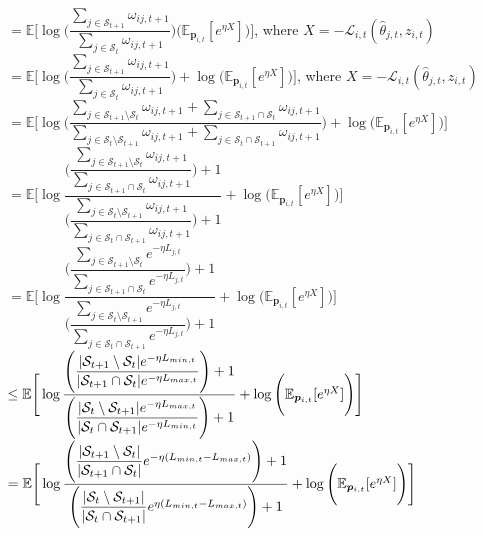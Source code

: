 \documentclass{article}
\theoremstyle{definition}
\begin{document}
    $=\mathbb{E}\Bigg[\log{\Bigg({\dfrac{\sum_{j\in\mathcal{S}_{t+1}}\omega_{ij,t+1}}{\sum_{j\in\mathcal{S}_{t}}\omega_{ij,t+1}}}\Bigg)\Bigg(\mathbb{E}_{\bm{p}_{i,t}}[e^{\eta X}]}\Bigg)\Bigg]$, where $X=-\mathcal{L}_{i,t}(\hat{\theta}_{j,t},z_{i,t})$\\
    $=\mathbb{E}\Bigg[\log{\Bigg({\dfrac{\sum_{j\in\mathcal{S}_{t+1}}\omega_{ij,t+1}}{\sum_{j\in\mathcal{S}_{t}}\omega_{ij,t+1}}}\Bigg)}+\log{\Bigg(\mathbb{E}_{\bm{p}_{i,t}}[e^{\eta X}]}\Bigg)\Bigg]$, where $X=-\mathcal{L}_{i,t}(\hat{\theta}_{j,t},z_{i,t})$\\
    $=\mathbb{E}\Bigg[\log{\Bigg({\dfrac{\sum_{j\in\mathcal{S}_{t+1}\setminus\mathcal{S}_{t}}\omega_{ij,t+1}+\sum_{j\in\mathcal{S}_{t+1}\cap\mathcal{S}_{t}}\omega_{ij,t+1}}{\sum_{j\in\mathcal{S}_{t}\setminus\mathcal{S}_{t+1}}\omega_{ij,t+1}+\sum_{j\in\mathcal{S}_{t}\cap\mathcal{S}_{t+1}}\omega_{ij,t+1}}}\Bigg)}+\log{\Bigg(\mathbb{E}_{\bm{p}_{i,t}}[e^{\eta X}]}\Bigg)\Bigg]$\\
    $=\mathbb{E}\Bigg[\log{{\dfrac{\Bigg(\dfrac{\sum_{j\in\mathcal{S}_{t+1}\setminus\mathcal{S}_{t}}\omega_{ij,t+1}}{\sum_{j\in\mathcal{S}_{t+1}\cap\mathcal{S}_{t}}\omega_{ij,t+1}}\Bigg)+1}{\Bigg(\dfrac{\sum_{j\in\mathcal{S}_{t}\setminus\mathcal{S}_{t+1}}\omega_{ij,t+1}}{\sum_{j\in\mathcal{S}_{t}\cap\mathcal{S}_{t+1}}\omega_{ij,t+1}}\Bigg)+1}}}+\log{\Bigg(\mathbb{E}_{\bm{p}_{i,t}}[e^{\eta X}]}\Bigg)\Bigg]$\\
    $=\mathbb{E}\Bigg[\log{{\dfrac{\Bigg(\dfrac{\sum_{j\in\mathcal{S}_{t+1}\setminus\mathcal{S}_{t}}e^{-\eta L_{j,t}}}{\sum_{j\in\mathcal{S}_{t+1}\cap\mathcal{S}_{t}}e^{-\eta L_{j,t}}}\Bigg)+1}{\Bigg(\dfrac{\sum_{j\in\mathcal{S}_{t}\setminus\mathcal{S}_{t+1}}e^{-\eta L_{j,t}}}{\sum_{j\in\mathcal{S}_{t}\cap\mathcal{S}_{t+1}}e^{-\eta L_{j,t}}}\Bigg)+1}}}+\log{\Bigg(\mathbb{E}_{\bm{p}_{i,t}}[e^{\eta X}]}\Bigg)\Bigg]$\\
    $\leq\mathbb{E}\Bigg[\log{{\dfrac{\Bigg(\dfrac{\abs{\mathcal{S}_{t+1}\setminus\mathcal{S}_{t}}e^{-\eta L_{min,t}}}{\abs{\mathcal{S}_{t+1}\cap\mathcal{S}_{t}}e^{-\eta L_{max,t}}}\Bigg)+1}{\Bigg(\dfrac{\abs{\mathcal{S}_{t}\setminus\mathcal{S}_{t+1}}e^{-\eta L_{max,t}}}{\abs{\mathcal{S}_{t}\cap\mathcal{S}_{t+1}}e^{-\eta L_{min,t}}}\Bigg)+1}}}+\log{\Bigg(\mathbb{E}_{\bm{p}_{i,t}}[e^{\eta X}]}\Bigg)\Bigg]$\\
    $=\mathbb{E}\Bigg[\log{{\dfrac{\Bigg(\dfrac{\abs{\mathcal{S}_{t+1}\setminus\mathcal{S}_{t}}}{\abs{\mathcal{S}_{t+1}\cap\mathcal{S}_{t}}}e^{-\eta(L_{min,t}-L_{max,t})}\Bigg)+1}{\Bigg(\dfrac{\abs{\mathcal{S}_{t}\setminus\mathcal{S}_{t+1}}}{\abs{\mathcal{S}_{t}\cap\mathcal{S}_{t+1}}}e^{\eta(L_{min,t}-L_{max,t})}\Bigg)+1}}}+\log{\Bigg(\mathbb{E}_{\bm{p}_{i,t}}[e^{\eta X}]}\Bigg)\Bigg]$\\
\end{document}

